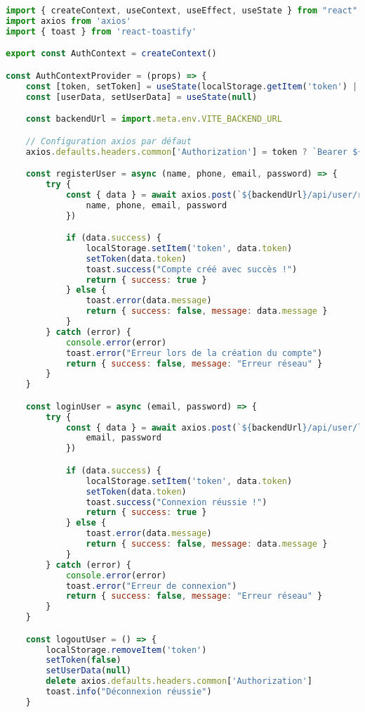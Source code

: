 \begin{lstlisting}[language=JavaScript, caption=AuthContext.jsx - Gestion de l'authentification globale]
import { createContext, useContext, useEffect, useState } from "react"
import axios from 'axios'
import { toast } from 'react-toastify'

export const AuthContext = createContext()

const AuthContextProvider = (props) => {
    const [token, setToken] = useState(localStorage.getItem('token') || false)
    const [userData, setUserData] = useState(null)

    const backendUrl = import.meta.env.VITE_BACKEND_URL

    // Configuration axios par défaut
    axios.defaults.headers.common['Authorization'] = token ? `Bearer ${token}` : ''

    const registerUser = async (name, phone, email, password) => {
        try {
            const { data } = await axios.post(`${backendUrl}/api/user/register`, {
                name, phone, email, password
            })

            if (data.success) {
                localStorage.setItem('token', data.token)
                setToken(data.token)
                toast.success("Compte créé avec succès !")
                return { success: true }
            } else {
                toast.error(data.message)
                return { success: false, message: data.message }
            }
        } catch (error) {
            console.error(error)
            toast.error("Erreur lors de la création du compte")
            return { success: false, message: "Erreur réseau" }
        }
    }

    const loginUser = async (email, password) => {
        try {
            const { data } = await axios.post(`${backendUrl}/api/user/login`, {
                email, password
            })

            if (data.success) {
                localStorage.setItem('token', data.token)
                setToken(data.token)
                toast.success("Connexion réussie !")
                return { success: true }
            } else {
                toast.error(data.message)
                return { success: false, message: data.message }
            }
        } catch (error) {
            console.error(error)
            toast.error("Erreur de connexion")
            return { success: false, message: "Erreur réseau" }
        }
    }

    const logoutUser = () => {
        localStorage.removeItem('token')
        setToken(false)
        setUserData(null)
        delete axios.defaults.headers.common['Authorization']
        toast.info("Déconnexion réussie")
    }


\end{lstlisting}

